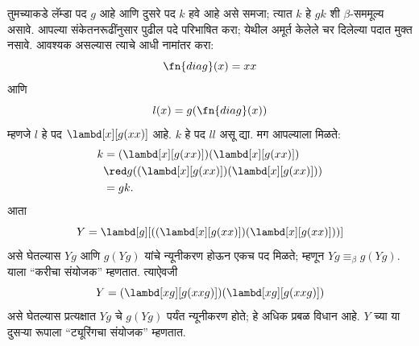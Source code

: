 \documentclass[../../../include/open-logic-section]{subfiles}
\begin{document}

तुमच्याकडे लॅम्डा पद $g$ आहे आणि दुसरे पद $k$ हवे
आहे असे समजा; त्यात $k$ हे $gk$ शी
$\beta$-सममूल्य असावे.
आपल्या संकेतनरूढींनुसार पुढील पदे परिभाषित करा;
येथील अमूर्त केलेले चर दिलेल्या पदात मुक्त नसावे.
आवश्यक असल्यास त्याचे आधी नामांतर करा:
\[
\fn{diag}(x) = xx
\]
आणि
\[
l(x) = g(\fn{diag}(x))
\]
म्हणजे $l$ हे पद $\lambd[x][g(xx)]$ आहे.
$k$ हे पद $ll$ असू द्या. मग आपल्याला मिळते:
\begin{align*}
k & = (\lambd[x][g(xx)])(\lambd[x][g(xx)]) \\
& \red  g((\lambd[x][g(xx)])(\lambd[x][g(xx)])) \\
& = gk.
\end{align*}
आता
\[
Y = \lambd[g][((\lambd[x][g(xx)])(\lambd[x][g(xx)]))]
\]
असे घेतल्यास $Yg$ आणि $g(Yg)$ यांचे न्यूनीकरण
होऊन एकच पद मिळते; म्हणून $Yg \equiv_\beta
g(Yg)$. याला “करीचा संयोजक” म्हणतात. त्याऐवजी
\[
Y = (\lambd[xg][g(xxg)])(\lambd[xg][g(xxg)])
\]
असे घेतल्यास प्रत्यक्षात $Yg$ चे $g(Yg)$ पर्यंत
न्यूनीकरण होते; हे अधिक प्रबळ विधान आहे.
$Y$ च्या या दुसऱ्या रूपाला “ट्यूरिंगचा संयोजक”
म्हणतात.
\end{document}
